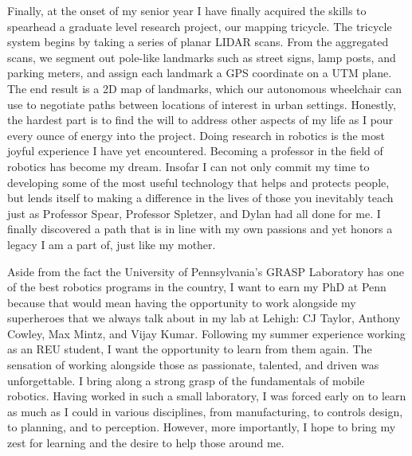 \documentclass{article}
\begin{document}
Finally, at the onset of my senior year I have finally acquired the skills to
spearhead a graduate level research project, our mapping tricycle. The tricycle
system begins by taking a series of planar LIDAR scans. From the aggregated
scans, we segment out pole-like landmarks such as street signs, lamp posts, and
parking meters, and assign each landmark a GPS coordinate on a UTM plane.  The
end result is a 2D map of landmarks, which our autonomous wheelchair can use to
negotiate paths between locations of interest in urban settings. Honestly, the
hardest part is to find the will to address other aspects of my life as I pour
every ounce of energy into the project. Doing research in robotics is the most
joyful experience I have yet encountered. Becoming a professor in the field of
robotics has become my dream. Insofar I can not only commit my time to
developing some of the most useful technology that helps and protects people,
but lends itself to making a difference in the lives of those you inevitably
teach just as Professor Spear, Professor Spletzer, and Dylan had all done for
me. I finally discovered a path that is in line with my own passions and yet
honors a legacy I am a part of, just like my mother.

Aside from the fact the University of Pennsylvania’s GRASP Laboratory has one
of the best robotics programs in the country, I want to earn my PhD at Penn
because that would mean having the opportunity to work alongside my superheroes
that we always talk about in my lab at Lehigh: CJ Taylor, Anthony Cowley, Max
Mintz, and Vijay Kumar. Following my summer experience working as an REU
student, I want the opportunity to learn from them again. The sensation of
working alongside those as passionate, talented, and driven was unforgettable.
I bring along a strong grasp of the fundamentals of mobile robotics. Having
worked in such a small laboratory, I was forced early on to learn as much as I
could in various disciplines, from manufacturing, to controls design, to
planning, and to perception. However, more importantly, I hope to bring my zest
for learning and the desire to help those around me. 
\end{document}
